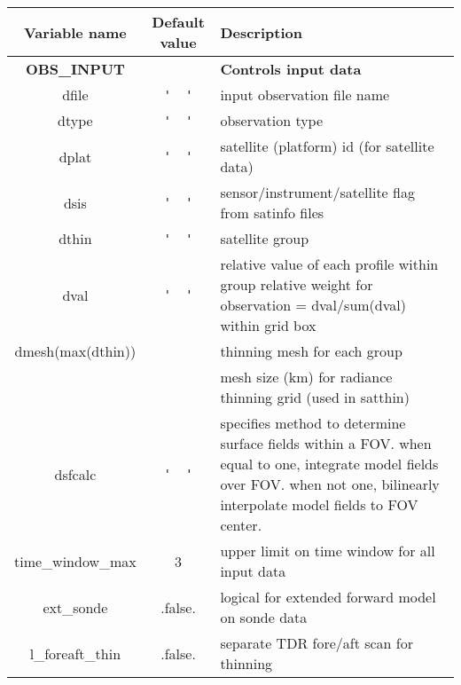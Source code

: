 \begin{table}[h]
 \footnotesize
 \center
 \begin{tabular}{| c | c | p{9cm} |}
 \hline
 Variable name & Default value & Description \\
 \hline
 \textbf{OBS\_INPUT} & &  \textbf{Controls input data} \\
 \hline
 dfile & \verb|'  '| & input observation file name \\
 \hline
 dtype & \verb|'  '| & observation type \\
 \hline
 dplat & \verb|'  '| & satellite (platform) id (for satellite data) \\
 \hline
 dsis & \verb|'  '| & sensor/instrument/satellite flag from satinfo files \\
 \hline
 dthin & \verb|'  '| & satellite group \\
 \hline
 dval & \verb|'  '| & relative value of each profile within group relative weight for observation = dval/sum(dval) within grid box \\
 \hline
 dmesh(max(dthin)) &  & thinning mesh for each group \\
                   & &  mesh size (km) for radiance thinning grid (used in satthin) \\
 \hline
 dsfcalc & \verb|'  '| & specifies method to determine surface fields within a FOV. when equal to one, integrate model fields over FOV. when not one, bilinearly interpolate model fields to FOV center.\\
 \hline
 time\_window\_max & 3 & upper limit on time window for all input data \\
 \hline
 ext\_sonde & .false. & logical for extended forward model on sonde data \\
 \hline
 l\_foreaft\_thin & .false. & separate TDR fore/aft scan for thinning \\
 \hline
 \end{tabular}
\end{table}

